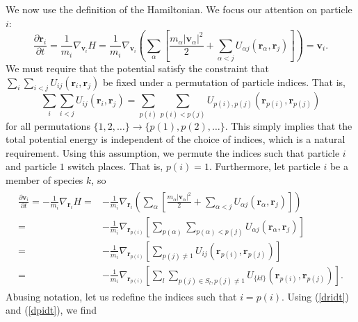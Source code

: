 \documentclass{article}
\begin{document}
We now use the definition of the Hamiltonian. We focus our attention on particle $i$:
\begin{equation}
\frac{\partial \mathbf{r}_i}{\partial t}=\frac{1}{m_i}\nabla_{\mathbf{v}_i}H=\frac{1}{m_i}\nabla_{\mathbf{v}_i}\left(\sum_\alpha\left[\frac{m_\alpha|\mathbf{v}_\alpha|^2}{2}+\sum_{\alpha<j}U_{\alpha j}(\mathbf{r}_\alpha,\mathbf{r}_j)\right]\right)=\mathbf{v}_i.\label{dridt}
\end{equation}
We must require that the potential satisfy the constraint that $\sum_i\sum_{i<j}U_{ij}(\mathbf{r}_i,\mathbf{r}_j)$ be fixed under a permutation of particle indices. That is,
\[\sum_i\sum_{i<j} U_{ij}(\mathbf{r}_i,\mathbf{r}_j)=\sum_{p(i)}\sum_{p(i)<p(j)}U_{p(i),p(j)}(\mathbf{r}_{p(i)},\mathbf{r}_{p(j)})
\] for all permutations $\{1,2,\dots\}\to\{p(1),p(2),\dots\}$. This simply implies that the total potential energy is independent of the choice of indices, which is a natural requirement. Using this assumption, we permute the indices such that particle $i$ and particle $1$ switch places. That is, $p(i)=1$. Furthermore, let particle $i$ be a member of species $k$, so
\begin{align}
\begin{split}
\frac{\partial \mathbf{v}_i}{\partial t}=-\frac{1}{m_i}\nabla_{\mathbf{r}_i}H=&-\frac{1}{m_i}\nabla_{\mathbf{r}_i}\left(\sum_\alpha\left[\frac{m_\alpha|\mathbf{v}_\alpha|^2}{2}+\sum_{\alpha<j}U_{\alpha j}(\mathbf{r}_\alpha,\mathbf{r}_j)\right]\right)
\\=&-\frac{1}{m_i}\nabla_{\mathbf{r}_{p(i)}} \left[\sum_{p(\alpha)}\sum_{p(\alpha)<p(j)}U_{\alpha j}(\mathbf{r}_\alpha,\mathbf{r}_j)\right]\\
=&-\frac{1}{m_i}\nabla_{\mathbf{r}_{p(i)}}\left[\sum_{p(j)\neq 1}U_{ij}(\mathbf{r}_{p(i)},\mathbf{r}_{p(j)})\right]\\
=&-\frac{1}{m_i}\nabla_{\mathbf{r}_{p(i)}}\left[\sum_l\sum_{p(j)\in S_l,p(j)\neq 1}U_{\{kl\}}(\mathbf{r}_{p(i)},\mathbf{r}_{p(j)})\right].\label{dpidt}
\end{split}\end{align}
Abusing notation, let us redefine the indices such that $i=p(i)$. Using (\ref{dridt}) and (\ref{dpidt}), we find
\end{document}
